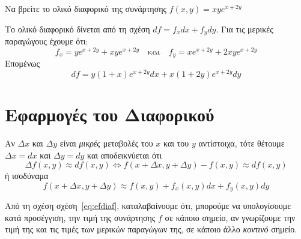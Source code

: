 \begin{example}
  Να βρείτε το ολικό διαφορικό της συνάρτησης $ f(x,y) = xye^{x+2y} $ 
\end{example}
\begin{solution}
\item {}
  Το ολικό διαφορικό δίνεται από τη σχέση $ df = f_{x} dx + f_{y} dy $.  
  Για τις μερικές παραγώγους έχουμε ότι: 
  \[
    f_{x} = ye^{x+2y}+xye^{x+2y} \quad \text{και} \quad f_{y} = xe^{x+2y} +
    2xye^{x+2y}
  \] 
  Επομένως
  \[
    df = y(1+x)e^{x+2y} dx + x(1+2y)e^{x+2y}dy
  \]
\end{solution}

\section{Εφαρμογές του Διαφορικού}

Αν $ \Delta x $ και $ \Delta y $ είναι \textit{μικρές} μεταβολές του $ x $ και του $y$ 
αντίστοιχα, τότε θέτουμε $ \Delta x = dx $ και $ \Delta y = dy $ και 
αποδεικνύεται ότι 
\[
  \Delta f(x,y) \approx df (x,y) \Leftrightarrow f(x+\Delta x, y+\Delta y) - f(x,y) 
  \approx df(x,y)
\] 
ή ισοδύναμα 
\begin{equation}\label{eq:efdiaf}
  \boxed{f(x+\Delta x, y+\Delta y) \approx f(x,y) + f_{x}(x,y)dx + f_{y}(x,y)dy}
\end{equation}

\begin{rem}
  Από τη σχέση σχέση~\eqref{eq:efdiaf}, καταλαβαίνουμε ότι, μπορούμε να υπολογίσουμε 
  κατά προσέγγιση, την τιμή της συνάρτησης $f$ σε κάποιο σημείο, αν γνωρίζουμε 
  την τιμή της και τις τιμές των μερικών παραγώγων της, σε κάποιο άλλο
  \textit{κοντινό} σημείο.
\end{rem}

